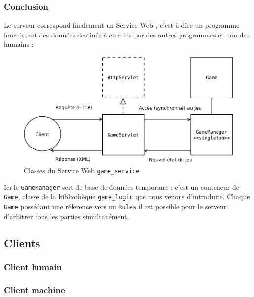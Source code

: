 \subsubsection{Conclusion}
Le serveur correspond finalement un \og Service Web \fg{}, c'est à dire un programme fournissant des données destinés à etre lus par des autres programmes et non des humains :
\begin{figure}[H] 
\centering
\includegraphics[width=\textwidth]{files/env/game_service} 
\caption{Classes du Service Web \texttt{game\_service}} 
\label{game_service}
\end{figure}
Ici le \texttt{GameManager} sert de base de données temporaire : c'est un conteneur de \texttt{Game}, classe de la bibliothèque \texttt{game\_logic} que nous venons d'introduire. Chaque \texttt{Game} possédant une réference vers un \texttt{Rules} il est possible pour le serveur d'arbitrer tous les parties simultanément.

\subsection{Clients}
\subsubsection{Client humain}

\subsubsection{Client machine}